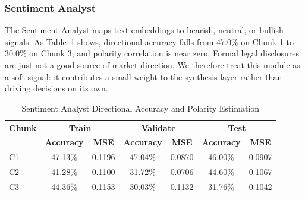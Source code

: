 \documentclass[conference]{IEEEtran}
\begin{document}
\subsubsection{Sentiment Analyst}
The Sentiment Analyst maps text embeddings to bearish, neutral, or bullish signals. As Table~\ref{tab:sentiment} shows, directional accuracy falls from 47.0\% on Chunk 1 to 30.0\% on Chunk 3, and polarity correlation is near zero. Formal legal disclosures are just not a good source of market direction. We therefore treat this module as a soft signal: it contributes a small weight to the synthesis layer rather than driving decisions on its own. 
    \begin{table}[htbp]
    \caption{Sentiment Analyst Directional Accuracy and Polarity Estimation}
    \label{tab:sentiment}
    \centering
    \scriptsize
    \setlength{\tabcolsep}{3pt}
    \renewcommand{\arraystretch}{0.92}
        \begin{tabular}{@{}lcccccc@{}}
        \toprule
        \textbf{Chunk} 
        & \multicolumn{2}{c}{\textbf{Train}} 
        & \multicolumn{2}{c}{\textbf{Validate}} 
        & \multicolumn{2}{c}{\textbf{Test}} \\
        & \textbf{Accuracy} & \textbf{MSE} 
        & \textbf{Accuracy} & \textbf{MSE} 
        & \textbf{Accuracy} & \textbf{MSE} \\
        \midrule
        C1 & 47.13\% & 0.1196 & 47.04\% & 0.0870 & 46.00\% & 0.0907 \\
        C2 & 41.28\% & 0.1100 & 31.72\% & 0.0706 & 44.60\% & 0.1067 \\
        C3 & 44.36\% & 0.1153 & 30.03\% & 0.1132 & 31.76\% & 0.1042 \\
        \bottomrule
        \end{tabular}
    \end{table}
\end{document}
